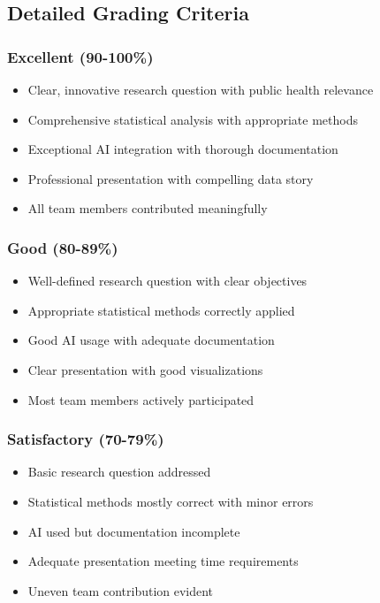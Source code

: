 \documentclass[11pt]{article}
\begin{document}
\subsection{Detailed Grading Criteria}

\subsubsection{Excellent (90-100\%)}
\begin{itemize}
\item Clear, innovative research question with public health relevance
\item Comprehensive statistical analysis with appropriate methods
\item Exceptional AI integration with thorough documentation
\item Professional presentation with compelling data story
\item All team members contributed meaningfully
\end{itemize}

\subsubsection{Good (80-89\%)}
\begin{itemize}
\item Well-defined research question with clear objectives
\item Appropriate statistical methods correctly applied
\item Good AI usage with adequate documentation
\item Clear presentation with good visualizations
\item Most team members actively participated
\end{itemize}

\subsubsection{Satisfactory (70-79\%)}
\begin{itemize}
\item Basic research question addressed
\item Statistical methods mostly correct with minor errors
\item AI used but documentation incomplete
\item Adequate presentation meeting time requirements
\item Uneven team contribution evident
\end{itemize}
\end{document}
